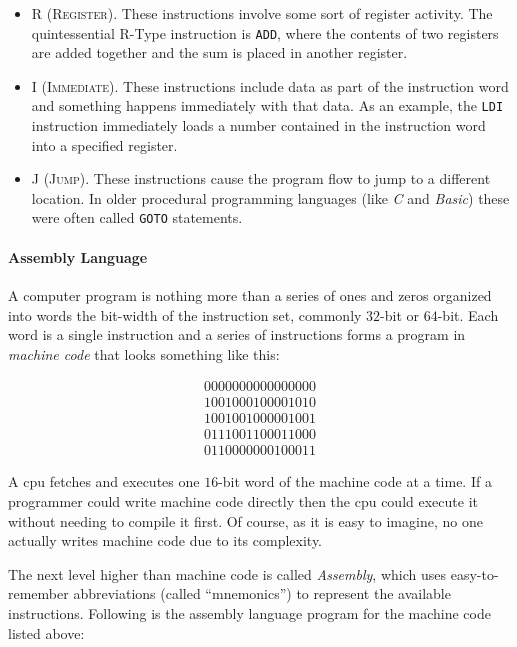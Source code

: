 \begin{itemize}
  \item \textsc{R (Register)}. These instructions involve some sort of register activity. The quintessential R-Type instruction is \lstinline[columns=fixed]|ADD|, where the contents of two registers are added together and the sum is placed in another register.
  \item \textsc{I (Immediate)}. These instructions include data as part of the instruction word and something happens immediately with that data. As an example, the \lstinline[columns=fixed]|LDI| instruction immediately loads a number contained in the instruction word into a specified register.
  \item \textsc{J (Jump)}. These instructions cause the program flow to jump to a different location. In older procedural programming languages (like \emph{C} and \emph{Basic}) these were often called \lstinline[columns=fixed]|GOTO| statements.
\end{itemize}

\paragraph{Assembly Language} A computer program is nothing more than a series of ones and zeros organized into words the bit-width of the instruction set,  commonly $ 32 $-bit or $ 64 $-bit. Each word is a single instruction and a series of instructions forms a program in \emph{machine code} that looks something like this:

\begin{align}
  \label{SIM:eq:sample_machine_code}
  0000 0000 0000 0000\\
  \nonumber
  1001 0001 0000 1010\\
  \nonumber
  1001 0010 0000 1001\\
  \nonumber
  0111 0011 0001 1000\\
  \nonumber
  0110 0000 0010 0011
\end{align}

A \gls{cpu} fetches and executes one $ 16 $-bit word of the machine code at a time. If a programmer could write machine code directly then the \gls{cpu} could execute it without needing to compile it first. Of course, as it is easy to imagine, no one actually writes machine code due to its complexity. 

The next level higher than machine code is called \emph{Assembly}, which uses easy-to-remember abbreviations (called ``mnemonics'') to represent the available  instructions. Following is the assembly language program for the machine code listed above:

